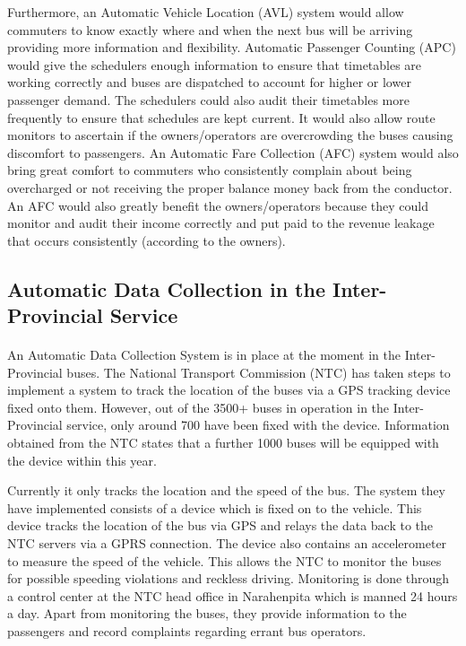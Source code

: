 \documentclass[12pt, oneside]{report}
\begin{document}
Furthermore, an Automatic Vehicle Location (AVL) system would allow commuters to know exactly where and when the next bus will be arriving providing more information and flexibility. Automatic Passenger Counting (APC) would give the schedulers enough information to ensure that timetables are working correctly and buses are dispatched to account for higher or lower passenger demand. The schedulers could also audit their timetables more frequently to ensure that schedules are kept current. It would also allow route monitors to ascertain if the owners/operators are overcrowding the buses causing discomfort to passengers. An Automatic Fare Collection (AFC) system would also bring great comfort to commuters who consistently complain about being overcharged or not receiving the proper balance money back from the conductor. An AFC would also greatly benefit the owners/operators because they could monitor and audit their income correctly and put paid to the revenue leakage that occurs consistently (according to the owners).

\subsection{Automatic Data Collection in the Inter-Provincial Service} 

\paragraph{ } An Automatic Data Collection System is in place at the moment in the Inter-Provincial buses. The National Transport Commission (NTC) has taken steps to implement a system to track the location of the buses via a GPS tracking device fixed onto them. However, out of the 3500+ buses in operation in the Inter-Provincial service, only around 700 have been fixed with the device. Information obtained from the NTC states that a further 1000 buses will be equipped with the device within this year.

Currently it only tracks the location and the speed of the bus. The system they have implemented consists of a device which is fixed on to the vehicle. This device tracks the location of the bus via GPS and relays the data back to the NTC servers via a GPRS connection. The device also contains an accelerometer to measure the speed of the vehicle. This allows the NTC to monitor the buses for possible speeding violations and reckless driving. Monitoring is done through a control center at the NTC head office in Narahenpita which is manned 24 hours a day. Apart from monitoring the buses, they provide information to the passengers and record complaints regarding errant bus operators.
\end{document}
